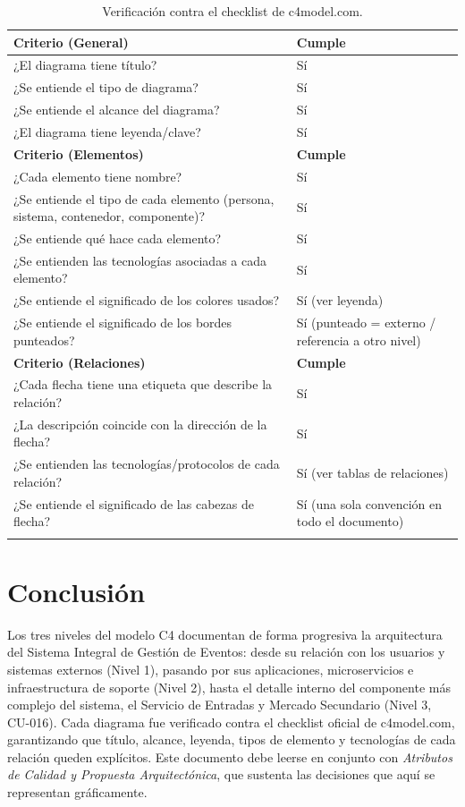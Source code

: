 \documentclass[12pt,a4paper]{article}
\begin{document}
\begin{longtable}{p{9.5cm}p{2cm}}
\toprule
\textbf{Criterio (General)} & \textbf{Cumple}\\
\midrule
¿El diagrama tiene título? & Sí\\
¿Se entiende el tipo de diagrama? & Sí\\
¿Se entiende el alcance del diagrama? & Sí\\
¿El diagrama tiene leyenda/clave? & Sí\\
\midrule
\textbf{Criterio (Elementos)} & \textbf{Cumple}\\
\midrule
¿Cada elemento tiene nombre? & Sí\\
¿Se entiende el tipo de cada elemento (persona, sistema, contenedor, componente)? & Sí\\
¿Se entiende qué hace cada elemento? & Sí\\
¿Se entienden las tecnologías asociadas a cada elemento? & Sí\\
¿Se entiende el significado de los colores usados? & Sí (ver leyenda)\\
¿Se entiende el significado de los bordes punteados? & Sí (punteado = externo / referencia a otro nivel)\\
\midrule
\textbf{Criterio (Relaciones)} & \textbf{Cumple}\\
\midrule
¿Cada flecha tiene una etiqueta que describe la relación? & Sí\\
¿La descripción coincide con la dirección de la flecha? & Sí\\
¿Se entienden las tecnologías/protocolos de cada relación? & Sí (ver tablas de relaciones)\\
¿Se entiende el significado de las cabezas de flecha? & Sí (una sola convención en todo el documento)\\
\bottomrule
\caption{Verificación contra el checklist de c4model.com.}
\end{longtable}

\section{Conclusión}

Los tres niveles del modelo C4 documentan de forma progresiva la arquitectura del Sistema
Integral de Gestión de Eventos: desde su relación con los usuarios y sistemas externos (Nivel 1),
pasando por sus aplicaciones, microservicios e infraestructura de soporte (Nivel 2), hasta el
detalle interno del componente más complejo del sistema, el Servicio de Entradas y Mercado
Secundario (Nivel 3, CU-016). Cada diagrama fue verificado contra el checklist oficial de
c4model.com, garantizando que título, alcance, leyenda, tipos de elemento y tecnologías de cada
relación queden explícitos. Este documento debe leerse en conjunto con \textit{Atributos de
Calidad y Propuesta Arquitectónica}, que sustenta las decisiones que aquí se representan
gráficamente.
\end{document}
